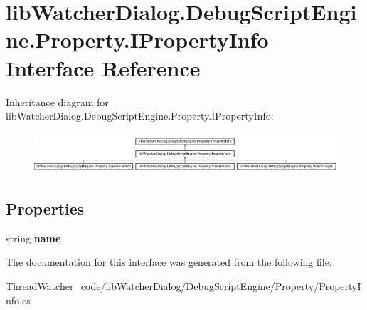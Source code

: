 \hypertarget{interfacelib_watcher_dialog_1_1_debug_script_engine_1_1_property_1_1_i_property_info}{\section{lib\+Watcher\+Dialog.\+Debug\+Script\+Engine.\+Property.\+I\+Property\+Info Interface Reference}
\label{interfacelib_watcher_dialog_1_1_debug_script_engine_1_1_property_1_1_i_property_info}
}
Inheritance diagram for lib\+Watcher\+Dialog.\+Debug\+Script\+Engine.\+Property.\+I\+Property\+Info\+:\begin{figure}[H]
\begin{center}
\leavevmode
\includegraphics[height=1.517615cm]{interfacelib_watcher_dialog_1_1_debug_script_engine_1_1_property_1_1_i_property_info}
\end{center}
\end{figure}
\subsection*{Properties}
\begin{DoxyCompactItemize}
\item 
\hypertarget{interfacelib_watcher_dialog_1_1_debug_script_engine_1_1_property_1_1_i_property_info_ab20168a73c8a866add444329659f1a1a}{string {\bfseries name}}\label{interfacelib_watcher_dialog_1_1_debug_script_engine_1_1_property_1_1_i_property_info_ab20168a73c8a866add444329659f1a1a}

\end{DoxyCompactItemize}


The documentation for this interface was generated from the following file\+:\begin{DoxyCompactItemize}
\item 
Thread\+Watcher\+\_\+code/lib\+Watcher\+Dialog/\+Debug\+Script\+Engine/\+Property/Property\+Info.\+cs\end{DoxyCompactItemize}
